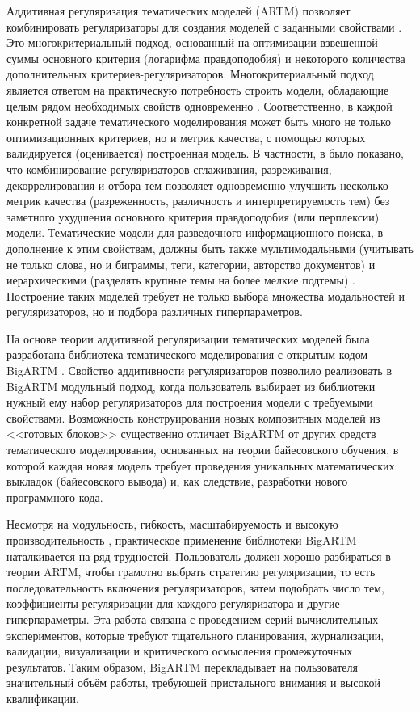 Аддитивная регуляризация тематических моделей (ARTM) позволяет комбинировать регуляризаторы для создания моделей с заданными свойствами \cite{vorontsov2014additive,voron15mlj}. Это многокритериальный подход, основанный на оптимизации взвешенной суммы основного критерия (логарифма правдоподобия) и некоторого количества дополнительных критериев-регуляризаторов. Многокритериальный подход является ответом на практическую потребность строить модели, обладающие целым рядом необходимых свойств одновременно \cite{kochedykov2017fast}.
Соответственно, в каждой конкретной задаче тематического моделирования может быть много не только оптимизационных критериев, но и метрик качества, с помощью которых валидируется (оценивается) построенная модель. В частности, в \cite{voron15mlj,voron15mlj} было показано, что комбинирование регуляризаторов сглаживания, разреживания, декоррелирования и отбора тем позволяет одновременно улучшить несколько метрик качества (разреженность, различность и интерпретируемость тем) без заметного ухудшения основного критерия правдоподобия (или перплексии) модели. Тематические модели для разведочного информационного поиска, в дополнение к этим свойствам, должны быть также мультимодальными (учитывать не только слова, но и биграммы, теги, категории, авторство документов) и иерархическими (разделять крупные темы на более мелкие подтемы) \cite{ianina2019regularized}. Построение таких моделей требует не только выбора множества модальностей и регуляризаторов, но и подбора различных гиперпараметров.

На основе теории аддитивной регуляризации тематических моделей
была разработана библиотека тематического моделирования с открытым кодом BigARTM \cite{vorontsov2015bigartm,frei2016parallel}.
Свойство аддитивности регуляризаторов позволило реализовать в BigARTM модульный подход, когда пользователь выбирает из библиотеки нужный ему набор регуляризаторов для построения модели с требуемыми свойствами.
Возможность конструирования новых композитных моделей из <<готовых блоков>> существенно отличает BigARTM от других средств тематического моделирования, основанных на теории байесовского обучения, в которой каждая новая модель требует проведения уникальных математических выкладок (байесовского вывода) и, как следствие, разработки нового программного кода.

Несмотря на модульность, гибкость, масштабируемость и высокую производительность \cite{kochedykov2017fast}, практическое применение библиотеки BigARTM наталкивается на ряд трудностей. Пользователь должен хорошо разбираться в теории ARTM, чтобы грамотно выбрать стратегию регуляризации, то есть последовательность включения регуляризаторов, затем подобрать число тем, коэффициенты регуляризации для каждого регуляризатора и другие гиперпараметры. Эта работа связана с проведением серий вычислительных экспериментов, которые требуют тщательного планирования, журнализации, валидации, визуализации и критического осмысления промежуточных результатов. Таким образом, BigARTM перекладывает на пользователя значительный объём работы, требующей пристального внимания и высокой квалификации.

